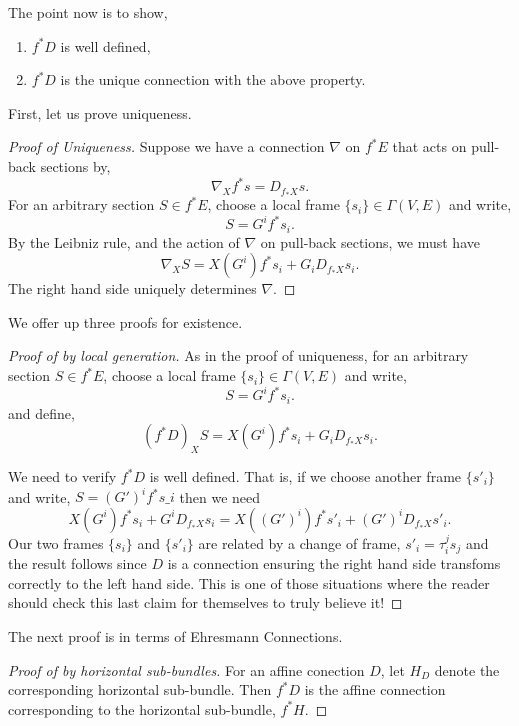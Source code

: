 \documentclass{amsart}
\begin{document}
The point now is to show,
\begin{enumerate}
\item \(f^{\ast} D\) is well defined,
\item \(f^{\ast} D\) is the unique connection with the above property.
\end{enumerate}

First, let us prove uniqueness.

\begin{proof}[Proof of Uniqueness]
Suppose we have a connection \(\nabla\) on \(f^{\ast} E\) that acts on pull-back sections by,
\[
\nabla_X f^{\ast} s = D_{f_{\ast} X} s.
\]
For an arbitrary section \(S \in f^{\ast} E\), choose a local frame \(\{s_i\} \in \Gamma(V, E)\) and write,
\[
S = G^i f^{\ast} s_i.
\]
By the Leibniz rule, and the action of \(\nabla\) on pull-back sections, we must have
\[
\nabla_X S = X (G^i) f^{\ast} s_i + G_i D_{f_{\ast} X} s_i.
\]
The right hand side uniquely determines \(\nabla\).
\end{proof}

We offer up three proofs for existence.

\begin{proof}[Proof of  by local generation]
As in the proof of uniqueness, for an arbitrary section \(S \in f^{\ast} E\), choose a local frame \(\{s_i\} \in \Gamma(V, E)\) and write,
\[
S = G^i f^{\ast} s_i.
\]
and define,
\[
(f^{\ast} D)_X S = X (G^i) f^{\ast} s_i + G_i D_{f_{\ast} X} s_i.
\]

We need to verify \(f^{\ast} D\) is well defined. That is, if we choose another frame \(\{s'_i\}\) and write, \(S = (G')^i f^{\ast} s\_i\) then we need
\[
X (G^i) f^{\ast} s_i + G^i D_{f_{\ast} X} s_i = X ((G')^i) f^{\ast} s'_i + (G')^i D_{f_{\ast} X} s'_i.
\]
Our two frames \(\{s_i\}\) and \(\{s'_i\}\) are related by a change of frame, \(s'_i = \tau^j_i s_j\) and the result follows since \(D\) is a connection ensuring the right hand side transfoms correctly to the left hand side. This is one of those situations where the reader should check this last claim for themselves to truly believe it!
\end{proof}

The next proof is in terms of Ehresmann Connections.

\begin{proof}[Proof of  by horizontal sub-bundles]
For an affine conection \(D\), let \(H_D\) denote the corresponding horizontal sub-bundle. Then \(f^{\ast} D\) is the affine connection corresponding to the horizontal sub-bundle, \(f^{\ast} H\).
\end{proof}
\end{document}
